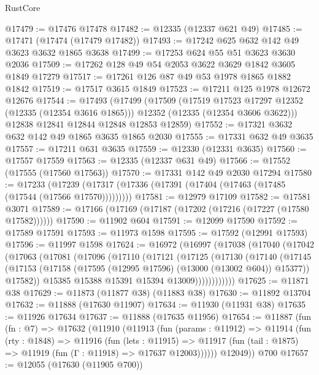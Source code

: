 \begin{lexlean}{RustCore}
\begin{coremodule}
@17479 := @17476 @17478
@17482 := @12335 (@12337 @621 @49)
@17485 := @17471 (@17474 (@17479 @17482))
@17493 := @17242 @625 @632 @142 @49 @3623 @3632 @1865 @3638
@17499 := @17253 @624 @55 @51 @3623 @3630 @2036
@17509 := @17262 @128 @49 @54 @2053 @3622 @3629 @1842 @3605 @1849 @17279
@17517 := @17261 @126 @87 @49 @53 @1978 @1865 @1882 @1842
@17519 := @17517 @3615 @1849
@17523 := @17211 @125 @1978 @12672 @12676
@17544 := @17493
    (@17499
      (@17509
        (@17519 @17523 @17297 @12352 (@12335 (@12354 @3616 @1865)))
        @12352
        (@12335 (@12354 @3606 @3622)))
      @12838
      @12841
      @12844
      @12848
      @12853
      @12859)
@17552 := @17321 @3632 @632 @142 @49 @1865 @3635 @1865 @2030
@17555 := @17331 @632 @49 @3635
@17557 := @17211 @631 @3635
@17559 := @12330 (@12331 @3635)
@17560 := @17557 @17559
@17563 := @12335 (@12337 @631 @49)
@17566 := @17552 (@17555 (@17560 @17563))
@17570 := @17331 @142 @49 @2030 @17294
@17580 := @17233
    (@17239 (@17317 (@17336 (@17391 (@17404 (@17463 (@17485 (@17544 (@17566 @17570)))))))))
@17581 := @12979 @17109
@17582 := @17581 @3071
@17589 := @17166 (@17169 (@17187 (@17202 (@17216 (@17227 (@17580 @17582))))))
@17590 := @11902 @604
@17591 := @12099 @17590
@17592 := @17589 @17591
@17593 := @11973 @1598
@17595 := @17592 (@12991 @17593)
@17596 := @11997 @1598
@17624 := @16972
    (@16997
      (@17038
        (@17040
          (@17042
            (@17063
              (@17081
                (@17096
                  (@17110
                    (@17121
                      (@17125
                        (@17130
                          (@17140
                            (@17145
                              (@17153
                                (@17158 (@17595 (@12995 @17596) (@13000 (@13002 @604)) @15377))
                                @17582))
                            @15385
                            @15388
                            @15391
                            @15394
                            @13009))))))))))))
@17625 := @11871 @38
@17629 := @11873 (@11877 @38) (@11883 @38)
@17630 := @11892 @13704
@17632 := @11888 (@17630 @11907)
@17634 := @11930 (@11931 @38)
@17635 := @11926 @17634
@17637 := @11888 (@17635 @11956)
@17654 := @11887
    (fun (fn : @7) =>
    @17632
      (@11910
        (@11913
          (fun (params : @11912) =>
          @11914
            (fun (rty : @1848) =>
            @11916
              (fun (lets : @11915) =>
              @11917 (fun (tail : @1875) => @11919 (fun (Γ : @11918) => @17637 @12003))))))
        @12049))
    @700
@17657 := @12055 (@17630 (@11905 @700))

\end{coremodule}
\end{lexlean}
